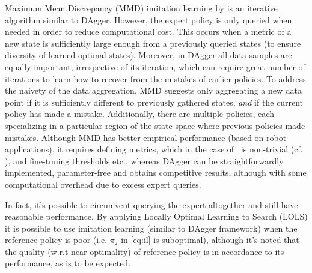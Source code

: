 

Maximum Mean Discrepancy (MMD) imitation learning by \cite{Kim13} is an 
iterative algorithm similar to DAgger. 
However, the expert policy is only queried when needed in order to reduce 
computational cost. 
This occurs when a metric of a new state is sufficiently large enough from a 
previously queried states (to ensure diversity of learned optimal states). 
Moreover, in DAgger all data samples are equally important, irrespective of its 
iteration, which can require great number of iterations to learn how to recover 
from the mistakes of earlier policies. To address the naivety of the data 
aggregation, MMD suggests only aggregating a new data point 
if it is sufficiently different to previously gathered states, \emph{and} if 
the current policy has made a mistake. 
Additionally, there are multiple policies, each specializing in a particular 
region of the state space where previous policies made mistakes.
Although MMD has better empirical performance (based on robot applications), it 
requires defining metrics, which in the case of \jsp\ is non-trivial (cf. 
\cite{InRu12}), and fine-tuning thresholds etc., whereas DAgger can be 
straightforwardly implemented, parameter-free and obtains competitive results, 
although with some computational overhead due to excess expert queries. 

In fact, it's possible to circumvent querying the expert altogether and still 
have reasonable performance. By applying Locally Optimal Learning to Search 
(LOLS) \cite{ChangKADL15} it is possible to use imitation learning (similar to 
DAgger framework) when the reference policy is poor (i.e. $\pi_\star$ in 
\cref{eq:il} is suboptimal), 
although it's noted that the quality (w.r.t near-optimality) of reference 
policy is in accordance to its performance, as is to be expected. 

